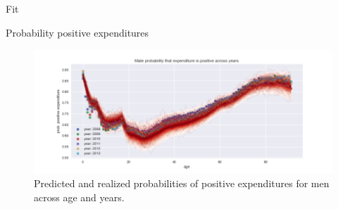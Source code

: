 \documentclass[presentation]{beamer}
\begin{document}
\begin{frame}[label={sec:org1abe136}]{Fit}
\begin{block}{Probability positive expenditures}
\begin{figure}[htbp]
\centering
\includegraphics[width=500px]{./PredictedPositiveExpenditureAcrossAge_healthy_Male.png}
\caption{\label{fig:predictedposexpend}
Predicted and realized probabilities of positive expenditures for men across age and years.}
\end{figure}
\end{block}
\end{frame}
\end{document}

